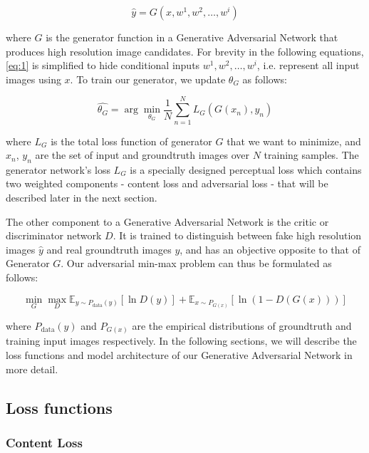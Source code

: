 \documentclass[tc, manuscript]{copernicus}
\begin{document}
\begin{equation}\label{eq:1}
  \hat{y} = G(x, w^1, w^2, \dots, w^i)
\end{equation}

where $G$ is the generator function in a Generative Adversarial Network that produces high resolution image candidates.
For brevity in the following equations, \eqref{eq:1} is simplified to hide conditional inputs $w^1, w^2, \dots, w^i$, i.e. represent all input images using $x$.
To train our generator, we update $\theta_G$ as follows:

\begin{equation}\label{eq:2}
  \hat{\theta_G} = \arg\min_{\theta_G} \frac{1}{N}\sum_{n=1}^{N}L_G(G(x_n), y_n)
\end{equation}

where $L_G$ is the total loss function of generator $G$ that we want to minimize, and $x_n$, $y_n$ are the set of input and groundtruth images over $N$ training samples.
The generator network's loss $L_G$ is a specially designed perceptual loss which contains two weighted components - content loss and adversarial loss - that will be described later in the next section.

The other component to a Generative Adversarial Network is the critic or discriminator network $D$.
It is trained to distinguish between fake high resolution images $\hat{y}$ and real groundtruth images $y$, and has an objective opposite to that of Generator $G$.
Our adversarial min-max problem can thus be formulated as follows:

\begin{equation}\label{eq:3}
  \min_{G} \max_{D} \mathbb{E}_{y \sim P_{\text{data}}(y)}[\ln D(y)] + \mathbb{E}_{x \sim P_{G(x)}}[\ln(1-D(G(x)))]
\end{equation}

where $P_{\text{data}}(y)$ and $P_{G(x)}$ are the empirical distributions of groundtruth and training input images respectively.
In the following sections, we will describe the loss functions and model architecture of our Generative Adversarial Network in more detail.

\subsection{Loss functions}

\subsubsection{Content Loss}
\end{document}
